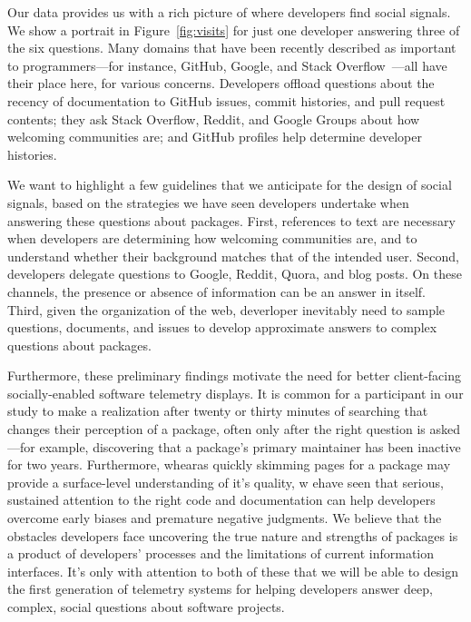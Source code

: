 Our data provides us with a rich picture of where developers find social signals.
We show a portrait in Figure~\ref{fig:visits} for just one developer answering three of the six questions.
Many domains that have been recently described as important to programmers---for instance, GitHub, Google, and Stack Overflow~\cite{storey_revolution_2014}---all have their place here, for various concerns.
Developers offload questions about the recency of documentation to GitHub issues, commit histories, and pull request contents;
they ask Stack Overflow, Reddit, and Google Groups about how welcoming communities are;
and GitHub profiles help determine developer histories.

We want to highlight a few guidelines that we anticipate for the design of social signals, based on the strategies we have seen developers undertake when answering these questions about packages.
First, references to text are necessary when developers are determining how welcoming communities are, and to understand whether their background matches that of the intended user.
Second, developers delegate questions to Google, Reddit, Quora, and blog posts.
On these channels, the presence or absence of information can be an answer in itself.
Third, given the organization of the web, deverloper inevitably need to sample questions, documents, and issues to develop approximate answers to complex questions about packages.

Furthermore, these preliminary findings motivate the need for better client-facing socially-enabled software telemetry displays.
It is common for a participant in our study to make a realization after twenty or thirty minutes of searching that changes their perception of a package, often only after the right question is asked---for example, discovering that a package's primary maintainer has been inactive for two years.
Furthermore, whearas quickly skimming pages for a package may provide a surface-level understanding of it's quality, w ehave seen that serious, sustained attention to the right code and documentation can help developers overcome early biases and premature negative judgments.
We believe that the obstacles developers face uncovering the true nature and strengths of packages is a product of developers' processes and the limitations of current information interfaces.
It's only with attention to both of these that we will be able to design the first generation of telemetry systems for helping developers answer deep, complex, social questions about software projects.

